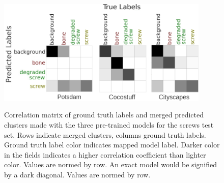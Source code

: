 \begin{figure}[!htb]
    \centering
    \includegraphics[width=0.9\textwidth]{pictures/experiment_1/all-combined_correlation_matrices}\\
    \caption[Correlation of Combined Clusters to Labels]{Correlation matrix of ground truth labels and merged predicted clusters made with the three pre-trained models for the screws test set. Rows indicate merged clusters, columns ground truth labels. Ground truth label color indicates mapped model label. Darker color in the fields indicates a higher correlation coefficient than lighter color. Values are normed by row. An exact model would be signified by a dark diagonal. Values are normed by row.}
    \label{fig:correlation-matrix-pretrained-combined}
\end{figure}

